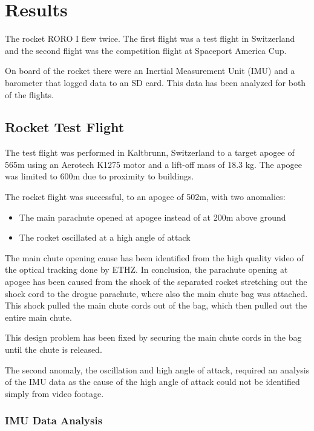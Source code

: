 \section{Results}

The rocket RORO I flew twice. The first flight was a test flight in Switzerland and the second flight was the competition flight at Spaceport America Cup.

On board of the rocket there were an Inertial Measurement Unit (IMU) and a barometer that logged data to an SD card.
This data has been analyzed for both of the flights.

\subsection{Rocket Test Flight}
\label{subsection:flightTests}

The test flight was performed in Kaltbrunn, Switzerland to a target apogee of 565m using an Aerotech K1275 motor and a lift-off mass of 18.3 kg. The apogee was limited to 600m due to proximity to buildings.

The rocket flight was successful, to an apogee of 502m, with two anomalies:
\begin{itemize}
    \item The main parachute opened at apogee instead of at 200m above ground
    \item The rocket oscillated at a high angle of attack
\end{itemize}

The main chute opening cause has been identified from the high quality video of the optical tracking done by ETHZ.
In conclusion, the parachute opening at apogee has been caused from the shock of the separated rocket stretching out the shock cord to the drogue parachute, where also the main chute bag was attached.
This shock pulled the main chute cords out of the bag, which then pulled out the entire main chute.

This design problem has been fixed by securing the main chute cords in the bag until the chute is released.

The second anomaly, the oscillation and high angle of attack, required an analysis of the IMU data as the cause of the high angle of attack could not be identified simply from video footage.

\subsubsection{IMU Data Analysis}

